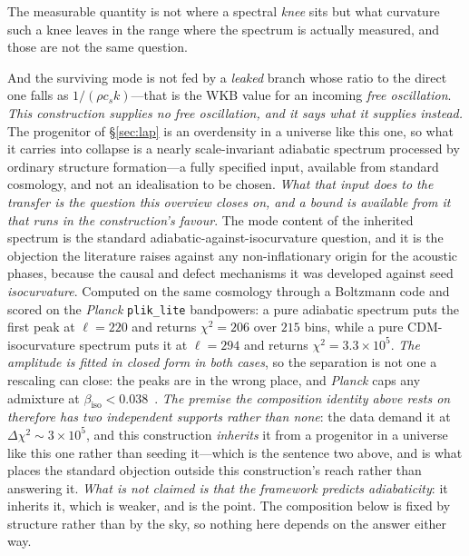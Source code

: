 \documentclass[11pt,a4paper]{article}
\theoremstyle{plain}
\theoremstyle{definition}
\theoremstyle{remark}
\begin{document}
The measurable quantity is not where a spectral \emph{knee} sits but what curvature such a knee leaves in the range where the spectrum is actually measured, and those are not the same question. 

And the surviving mode is not fed by a \emph{leaked} branch whose ratio to the direct one falls as $1/(\rho c_sk)$---that is the WKB value for an incoming \emph{free oscillation}. \emph{This construction supplies no free oscillation, and it says what it supplies instead.} The progenitor of \S\ref{sec:lap} is an overdensity in a universe like this one, so what it carries into collapse is a nearly scale-invariant adiabatic spectrum processed by ordinary structure formation---a fully specified input, available from standard cosmology, and not an idealisation to be chosen. \emph{What that input does to the transfer is the question this overview closes on, and a bound is available from it that runs in the construction's favour}. The mode content of the inherited spectrum is the standard adiabatic-against-isocurvature question, and it is the objection the literature raises against any non-inflationary origin for the acoustic phases, because the causal and defect mechanisms it was developed against seed \emph{isocurvature}. Computed on the same cosmology through a Boltzmann code and scored on the \emph{Planck} \texttt{plik\_lite} bandpowers: a pure adiabatic spectrum puts the first peak at $\ell=220$ and returns $\chi^{2}=206$ over $215$ bins, while a pure CDM-isocurvature spectrum puts it at $\ell=294$ and returns $\chi^{2}=3.3\times10^{5}$. \emph{The amplitude is fitted in closed form in both cases}, so the separation is not one a rescaling can close: the peaks are in the wrong place, and \emph{Planck} caps any admixture at $\beta_{\mathrm{iso}}<0.038$~\cite{Planck2018Inflation}. \emph{The premise the composition identity above rests on therefore has two independent supports rather than none}: the data demand it at $\Delta\chi^{2}\sim3\times10^{5}$, and this construction \emph{inherits} it from a progenitor in a universe like this one rather than seeding it---which is the sentence two above, and is what places the standard objection outside this construction's reach rather than answering it. \emph{What is not claimed is that the framework predicts adiabaticity}: it inherits it, which is weaker, and is the point. The composition below is fixed by structure rather than by the sky, so nothing here depends on the answer either way.
\end{document}

